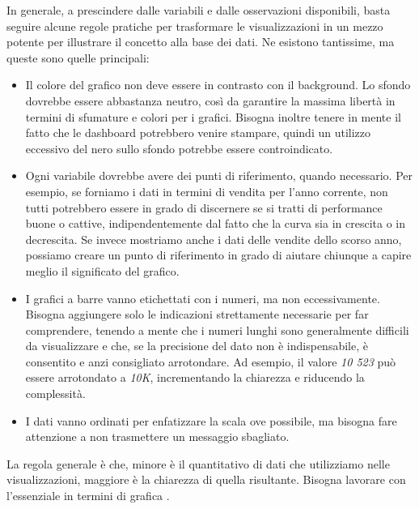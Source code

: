 In generale, a prescindere dalle variabili e dalle osservazioni disponibili, basta seguire alcune regole pratiche per trasformare le visualizzazioni in un mezzo potente per illustrare il concetto alla base dei dati. Ne esistono tantissime, ma queste sono quelle principali:
\begin{itemize}
    \item Il colore del grafico non deve essere in contrasto con il background.
    Lo sfondo dovrebbe essere abbastanza neutro, così da garantire la massima libertà in termini di sfumature e colori per i grafici. Bisogna inoltre tenere in mente il fatto che le dashboard potrebbero venire stampare, quindi un utilizzo eccessivo del nero sullo sfondo potrebbe essere controindicato.
    \item Ogni variabile dovrebbe avere dei punti di riferimento, quando necessario.
    Per esempio, se forniamo i dati in termini di vendita per l'anno corrente, non tutti potrebbero essere in grado di discernere se si tratti di performance buone o cattive, indipendentemente dal fatto che la curva sia in crescita o in decrescita. Se invece mostriamo anche i dati delle vendite dello scorso anno, possiamo creare un punto di riferimento in grado di aiutare chiunque a capire meglio il significato del grafico.
    \item I grafici a barre vanno etichettati con i numeri, ma non eccessivamente.
    Bisogna aggiungere solo le indicazioni strettamente necessarie per far comprendere, tenendo a mente che i numeri lunghi sono generalmente difficili da visualizzare e che, se la precisione del dato non è indispensabile, è consentito e anzi consigliato arrotondare. Ad esempio, il valore \textit{10 523} può essere arrotondato a \textit{10K}, incrementando la chiarezza e riducendo la complessità.
    \item I dati vanno ordinati per enfatizzare la scala ove possibile, ma bisogna fare attenzione a non trasmettere un messaggio sbagliato.
\end{itemize}
La regola generale è che, minore è il quantitativo di dati che utilizziamo nelle visualizzazioni, maggiore è la chiarezza di quella risultante. Bisogna lavorare con l'essenziale in termini di grafica \cite{DataVisualization_Caratteristiche}.


